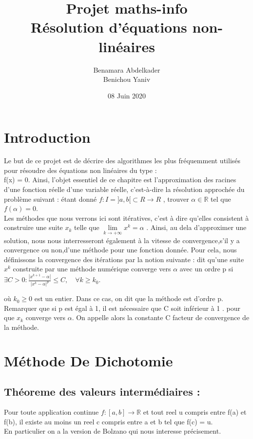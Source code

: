\documentclass{article}
\author{Benamara Abdelkader \\ Benichou Yaniv }
\date{08 Juin 2020}
\newcommand{\R}{\mathbb{R}}
\begin{document}
\title{Projet maths-info \\ 
Résolution d'équations non-linéaires}
\maketitle

\newpage
\tableofcontents
\newpage

\section{Introduction}
    Le but de ce projet est de décrire des algorithmes les plus fréquemment utilisés pour résoudre des équations non linéaires du type : \\ f(x) = 0.
    Ainsi, l'objet essentiel de ce chapitre est l’approximation des racines d’une fonction réelle d’une variable réelle, c’est-à-dire la résolution approchée du problème suivant :
    étant donné  $f : I =]a, b[ \subset R \rightarrow R$ , trouver $\alpha \in \pmb{\mathbb{R}}$ \quad tel que  $f(\alpha) = 0$. \\
 Les méthodes que nous verrons ici sont  itératives, c'est à dire qu'elles consistent à construire une suite $x_k$ telle que $\lim\limits_{k \rightarrow +\infty} x^k = \alpha$ . 
 Ainsi, au dela d'approximer une solution, nous nous interresseront également à la vitesse de convergence,s'il y a convergence ou non,d'une méthode pour une fonction donnée. 
 Pour cela, nous définissons la convergence des itérations par la notion suivante :
\quaddOn dit qu’une suite $x^k$ construite par une méthode numérique converge vers $\alpha$ avec un ordre p  si \quad $\exists C>0 : \frac{| x^{k+1} - \alpha |}{|x^k - \alpha |^p } \leq C ,\quad  \forall k \geq k_0 .$

où $k_0 \geq 0$ est un entier. Dans ce cas, on dit que la méthode est d’ordre p. Remarquer que si p est égal à 1, il est nécessaire que C soit inférieur à  1 .
pour que $x_k$ converge vers $\alpha$. On appelle alors la constante C facteur de convergence de la méthode.
\newpage


\section{Méthode De Dichotomie}
\subsection{Théoreme des valeurs intermédiaires :}
Pour toute application continue $ f : [a, b] \to \R $ et tout reel u compris entre f(a) et f(b), il existe au moins un reel c compris entre a et b tel que f(c) = u. \\
En particulier on a la version de Bolzano qui nous interesse précisement.
\end{document}
